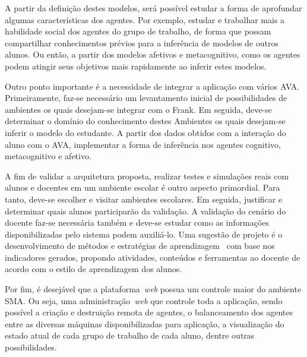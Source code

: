 A partir da definição destes modelos, será possível estudar a forma de aprofundar algumas características dos agentes. Por exemplo, estudar e trabalhar mais a habilidade social dos agentes do grupo de trabalho, de forma que possam compartilhar conhecimentos prévios para a inferência de modelos de outros alunos. Ou então, a partir dos modelos afetivos e metacognitivo, como os agentes podem atingir seus objetivos mais rapidamente ao inferir estes modelos.

Outro ponto importante é a necessidade de integrar a aplicação com vários AVA. Primeiramente, faz-se necessário um levantamento inicial de possibilidades de ambientes os quais desejam-se integrar com o Frank. Em seguida, deve-se determinar o domínio do conhecimento destes Ambientes os quais desejam-se inferir o modelo do estudante. A partir dos dados obtidos com a interação do aluno com o AVA, implementar a forma de inferência nos agentes cognitivo, metacognitivo e afetivo.

A fim de validar a arquitetura proposta, realizar testes e simulações reais com alunos e docentes em um ambiente escolar é outro aspecto primordial. Para tanto, deve-se escolher e visitar ambientes escolares. Em seguida, justificar e determinar quais alunos participarão da validação. A validação do cenário do docente faz-se necessária também e deve-se estudar como as informações disponibilizadas pelo sistema podem auxiliá-lo. Uma sugestão de projeto é o desenvolvimento de métodos e estratégias de aprendizagem~\cite{muhlbeier12} com base nos indicadores gerados, propondo atividades, conteúdos e ferramentas ao docente de acordo com o estilo de aprendizagem dos alunos.

Por fim, é desejável que a plataforma~\emph{web} possua um controle maior do ambiente SMA. Ou seja, uma administração~\emph{web} que controle toda a aplicação, sendo possível a criação e destruição remota de agentes, o balanceamento dos agentes entre as diversas máquinas disponibilizadas para aplicação, a visualização do estado atual de cada grupo de trabalho de cada aluno, dentre outras possibilidades.

